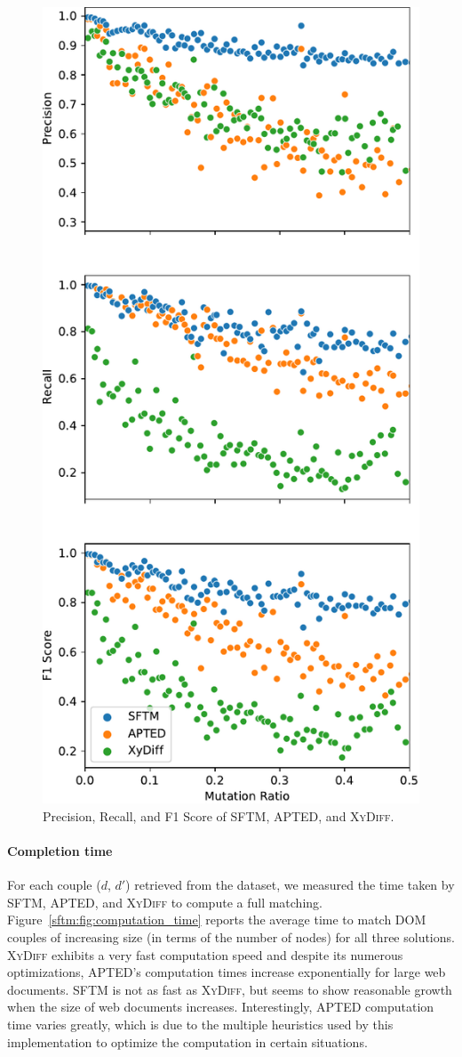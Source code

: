 \begin{figure}
  \centering
  \includegraphics[width=.65\linewidth]{tree-matching/graphs/f1score}
  \caption{Precision, Recall, and F1 Score of SFTM, APTED, and \textsc{XyDiff}.}
  \label{sftm:fig:f1score}
\end{figure}

\paragraph{Completion time}
For each couple ($d$, $d'$) retrieved from the dataset, we measured the time taken by SFTM, APTED, and \textsc{XyDiff} to compute a full matching.
Figure~\ref{sftm:fig:computation_time} reports the average time to match DOM couples of increasing size (in terms of the number of nodes) for all three solutions.
\textsc{XyDiff} exhibits a very fast computation speed and despite its numerous optimizations, APTED's computation times increase exponentially for large web documents.
SFTM is not as fast as \textsc{XyDiff}, but seems to show reasonable growth when the size of web documents increases.
Interestingly, APTED computation time varies greatly, which is due to the multiple heuristics used by this implementation to optimize the computation in certain situations.

